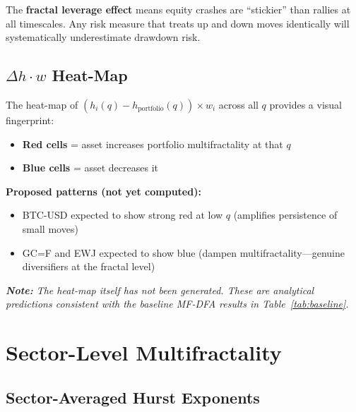 \documentclass[11pt,a4paper]{article}
\begin{document}
\begin{importantbox}
The \textbf{fractal leverage effect} means equity crashes are ``stickier'' than rallies at all timescales. Any risk measure that treats up and down moves identically will systematically underestimate drawdown risk.
\end{importantbox}

\subsection{$\Delta h \cdot w$ Heat-Map}

The heat-map of $(h_i(q) - h_{\text{portfolio}}(q)) \times w_i$ across all $q$ provides a visual fingerprint:
\begin{itemize}[nosep]
\item \textbf{Red cells} = asset increases portfolio multifractality at that $q$
\item \textbf{Blue cells} = asset decreases it
\end{itemize}

\textbf{Proposed patterns (not yet computed):}
\begin{itemize}[nosep]
\item BTC-USD expected to show strong red at low $q$ (amplifies persistence of small moves)
\item GC=F and EWJ expected to show blue (dampen multifractality---genuine diversifiers at the fractal level)
\end{itemize}

\textit{\textbf{Note:} The heat-map itself has not been generated. These are analytical predictions consistent with the baseline MF-DFA results in Table~\ref{tab:baseline}.}

\section{Sector-Level Multifractality}

\subsection{Sector-Averaged Hurst Exponents}
\end{document}
